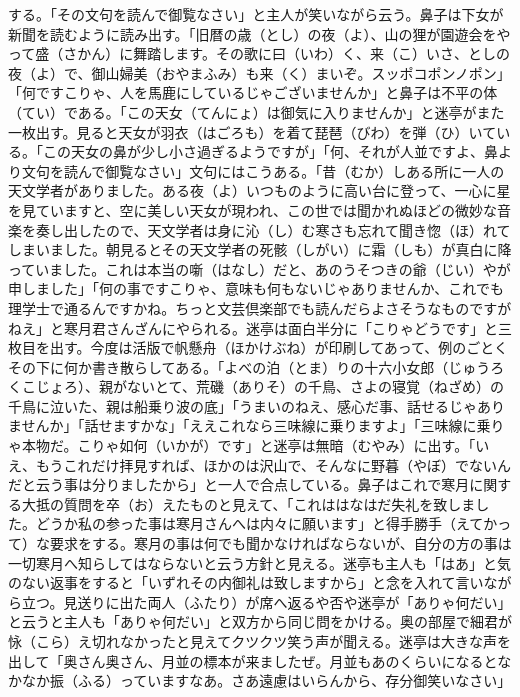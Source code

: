 \documentclass{book}
\begin{document}
する。「その文句を読んで御覧なさい」と主人が笑いながら云う。鼻子は下女が新聞を読むように読み出す。「旧暦の歳（とし）の夜（よ）、山の狸が園遊会をやって盛（さかん）に舞踏します。その歌に曰（いわ）く、来（こ）いさ、としの夜（よ）で、御山婦美（おやまふみ）も来（く）まいぞ。スッポコポンノポン」「何ですこりゃ、人を馬鹿にしているじゃございませんか」と鼻子は不平の体（てい）である。「この天女（てんにょ）は御気に入りませんか」と迷亭がまた一枚出す。見ると天女が羽衣（はごろも）を着て琵琶（びわ）を弾（ひ）いている。「この天女の鼻が少し小さ過ぎるようですが」「何、それが人並ですよ、鼻より文句を読んで御覧なさい」文句にはこうある。「昔（むか）しある所に一人の天文学者がありました。ある夜（よ）いつものように高い台に登って、一心に星を見ていますと、空に美しい天女が現われ、この世では聞かれぬほどの微妙な音楽を奏し出したので、天文学者は身に沁（し）む寒さも忘れて聞き惚（ほ）れてしまいました。朝見るとその天文学者の死骸（しがい）に霜（しも）が真白に降っていました。これは本当の噺（はなし）だと、あのうそつきの爺（じい）やが申しました」「何の事ですこりゃ、意味も何もないじゃありませんか、これでも理学士で通るんですかね。ちっと文芸倶楽部でも読んだらよさそうなものですがねえ」と寒月君さんざんにやられる。迷亭は面白半分に「こりゃどうです」と三枚目を出す。今度は活版で帆懸舟（ほかけぶね）が印刷してあって、例のごとくその下に何か書き散らしてある。「よべの泊（とま）りの十六小女郎（じゅうろくこじょろ）、親がないとて、荒磯（ありそ）の千鳥、さよの寝覚（ねざめ）の千鳥に泣いた、親は船乗り波の底」「うまいのねえ、感心だ事、話せるじゃありませんか」「話せますかな」「ええこれなら三味線に乗りますよ」「三味線に乗りゃ本物だ。こりゃ如何（いかが）です」と迷亭は無暗（むやみ）に出す。「いえ、もうこれだけ拝見すれば、ほかのは沢山で、そんなに野暮（やぼ）でないんだと云う事は分りましたから」と一人で合点している。鼻子はこれで寒月に関する大抵の質問を卒（お）えたものと見えて、「これははなはだ失礼を致しました。どうか私の参った事は寒月さんへは内々に願います」と得手勝手（えてかって）な要求をする。寒月の事は何でも聞かなければならないが、自分の方の事は一切寒月へ知らしてはならないと云う方針と見える。迷亭も主人も「はあ」と気のない返事をすると「いずれその内御礼は致しますから」と念を入れて言いながら立つ。見送りに出た両人（ふたり）が席へ返るや否や迷亭が「ありゃ何だい」と云うと主人も「ありゃ何だい」と双方から同じ問をかける。奥の部屋で細君が怺（こら）え切れなかったと見えてクツクツ笑う声が聞える。迷亭は大きな声を出して「奥さん奥さん、月並の標本が来ましたぜ。月並もあのくらいになるとなかなか振（ふる）っていますなあ。さあ遠慮はいらんから、存分御笑いなさい」
\end{document}

